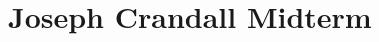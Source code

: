 \documentclass[main.tex]{subfiles}
\begin{document}
\begin{comment}
\subsubsection{Nonlinear Activation Function (NLAF)}

Logistic function where $x_0$, the $x$ value of the sigmoid's midpoint, $L$, the curve's maximum value, $k$, the logistic growth rate or steepness of the curve resulting in 

$$f(x)=\frac{L}{1+e^{-k\left(x-x_{0}\right)}}$$

\subsection{Introduction Theory}

\subsubsection{Communication Limits}
Shannon limit $C \sim \log _{2}(1+S N R)$, Density in electrical interconnects $B \propto A / \ell^{2}$

\subsubsection{Communication Limits}
Options for multiplexing, signal noise ratio (SNR) $\mathrm{C} \sim \mathrm{M} \times \mathrm{B} \times 2 \log _{2}(\mathrm{SNR})$

\subsection{Hardware for AI}
Biological Plausibility $x(t)=\sum_{j=1}^{n} \delta\left(t-\tau_{j}\right)$
\subsection{Optics for AI}
Montgomery Multiplication $\bar{C}=\frac{\bar{a} \bar{b}+\left(\bar{a} \bar{b} M^{-1} \bmod R\right) M}{R}$

\subsection{Photonic Integrated Hardware}

\end{comment}

\section{Joseph Crandall Midterm}
\end{document}
